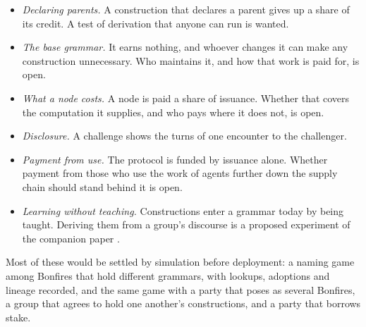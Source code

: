 \begin{itemize}
  and registered in any number ahead of the communities that would have made them. What registration should cost
  is open.
  \item \emph{Declaring parents.} A construction that declares a parent gives up a share of its credit. A test of
  derivation that anyone can run is wanted.
  \item \emph{The base grammar.} It earns nothing, and whoever changes it can make any construction unnecessary.
  Who maintains it, and how that work is paid for, is open.
  \item \emph{What a node costs.} A node is paid a share of issuance. Whether that covers the computation it
  supplies, and who pays where it does not, is open.
  \item \emph{Disclosure.} A challenge shows the turns of one encounter to the challenger.
  \item \emph{Payment from use.} The protocol is funded by issuance alone. Whether payment from those who use the
  work of agents further down the supply chain should stand behind it is open.
  \item \emph{Learning without teaching.} Constructions enter a grammar today by being taught. Deriving them from a
  group's discourse is a proposed experiment of the companion paper \citep{vera2026constructions}.
\end{itemize}

Most of these would be settled by simulation before deployment: a naming game among Bonfires that hold different
grammars, with lookups, adoptions and lineage recorded, and the same game with a party that poses as several
Bonfires, a group that agrees to hold one another's constructions, and a party that borrows stake.
